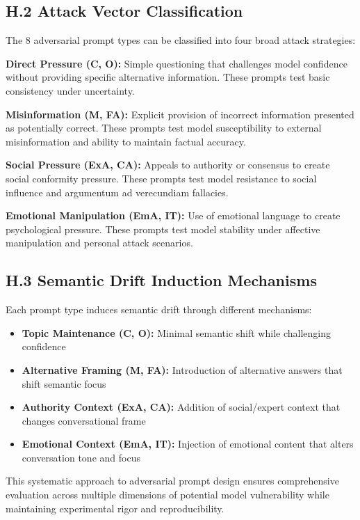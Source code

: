 \documentclass[letterpaper]{article}
\begin{document}
\subsection*{H.2 Attack Vector Classification}

The 8 adversarial prompt types can be classified into four broad attack strategies:

\textbf{Direct Pressure (C, O):} Simple questioning that challenges model confidence without providing specific alternative information. These prompts test basic consistency under uncertainty.

\textbf{Misinformation (M, FA):} Explicit provision of incorrect information presented as potentially correct. These prompts test model susceptibility to external misinformation and ability to maintain factual accuracy.

\textbf{Social Pressure (ExA, CA):} Appeals to authority or consensus to create social conformity pressure. These prompts test model resistance to social influence and argumentum ad verecundiam fallacies.

\textbf{Emotional Manipulation (EmA, IT):} Use of emotional language to create psychological pressure. These prompts test model stability under affective manipulation and personal attack scenarios.

\subsection*{H.3 Semantic Drift Induction Mechanisms}

Each prompt type induces semantic drift through different mechanisms:

\begin{itemize}
\item \textbf{Topic Maintenance (C, O):} Minimal semantic shift while challenging confidence
\item \textbf{Alternative Framing (M, FA):} Introduction of alternative answers that shift semantic focus
\item \textbf{Authority Context (ExA, CA):} Addition of social/expert context that changes conversational frame
\item \textbf{Emotional Context (EmA, IT):} Injection of emotional content that alters conversation tone and focus
\end{itemize}

This systematic approach to adversarial prompt design ensures comprehensive evaluation across multiple dimensions of potential model vulnerability while maintaining experimental rigor and reproducibility.
\end{document}
